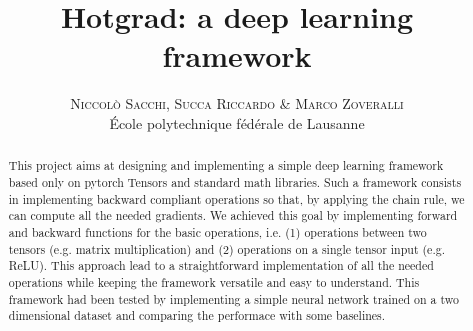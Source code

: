\documentclass[10pt,conference,compsocconf]{IEEEtran}
\begin{document}
        
\pretitle{\begin{center}\Huge\bfseries} %
\posttitle{\end{center}} %
\title{Hotgrad: a deep learning framework}
\author{
        \textsc{Niccol\`{o} Sacchi, Succa Riccardo \& Marco Zoveralli}
        \normalsize{} \\
        \normalsize \'{E}cole polytechnique f\'{e}d\'{e}rale de Lausanne
}
\maketitle
\begin{abstract}
This project aims at designing and implementing a simple deep learning framework based only on pytorch Tensors and standard math libraries. Such a framework consists in implementing backward compliant operations so that, by applying the chain rule, we can compute all the needed gradients. We achieved this goal by implementing forward and backward functions for the basic operations, i.e. (1) operations between two tensors (e.g. matrix multiplication) and (2) operations on a single tensor input (e.g. ReLU). This approach lead to a straightforward implementation of all the needed operations while keeping the framework versatile and easy to understand.
This framework had been tested by implementing a simple neural network trained on a two dimensional dataset and comparing the performace with some baselines.
\end{abstract}
\end{document}
